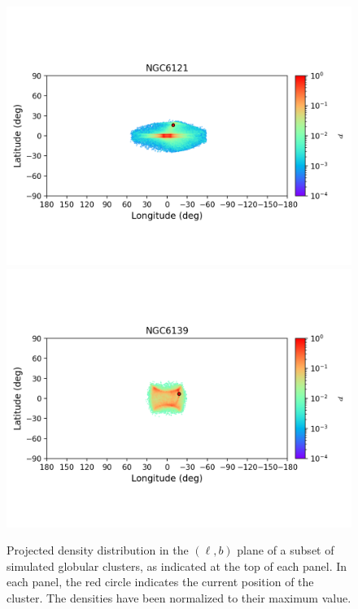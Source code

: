 \begin{figure}
\begin{center}
                \includegraphics[clip=true, trim = 0mm 20mm 0mm 10mm, width=1\columnwidth]{images/error_plots_NGC6121.png}
                \includegraphics[clip=true, trim = 0mm 20mm 0mm 10mm, width=1\columnwidth]{images/error_plots_NGC6139.png}
            \end{center}
            \caption[]{Projected density distribution in the $(\ell, b)$ plane of a subset of simulated globular clusters, as indicated at the top of each panel. In each panel, the red circle indicates the current position of the cluster. The densities have been normalized to their maximum value.}\label{stream7}
        \end{figure}


